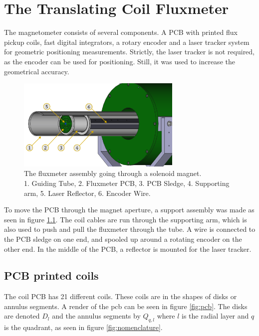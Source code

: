 \chapter{The Translating Coil Fluxmeter}
The magnetometer consists of several components. A PCB with
printed flux pickup coils, fast digital integrators, a rotary
encoder and a laser tracker system for geometric positioning measurements.
Strictly, the laser tracker is not required, as the encoder can be used
for positioning. Still, it was used to increase
the geometrical accuracy.

\begin{figure}[!h]
    \centering
    \includegraphics[width=0.7\textwidth]{figs/elena}
    \caption{The fluxmeter assembly going through a solenoid magnet. \\
        1. Guiding Tube, 2. Fluxmeter PCB, 3. PCB Sledge, 4. Supporting arm,
        5. Laser Reflector, 6. Encoder Wire.}
    \label{fig:elena}
\end{figure}

To move the PCB through the magnet aperture, a support assembly was made as
seen in figure \ref{fig:elena}. The coil cables are run through the supporting
arm, which is also used to push and pull the fluxmeter through the tube. A
wire is connected to the PCB sledge on one end, and spooled up around
a rotating encoder on the other end. In the middle of the PCB, a
reflector is mounted for the laser tracker.

\section{PCB printed coils}
The coil PCB has 21 different coils.
These coils are in the shapes of disks or annulus segments.
A render of the pcb can be seen in figure
\ref{fig:pcb}. The disks are denoted $D_l$ and the
annulus segments by $Q_{q, l}$ where $l$ is the radial layer and
$q$ is the quadrant, as seen in figure \ref{fig:nomenclature}.

